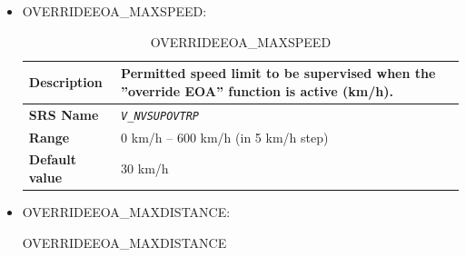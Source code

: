 \begin{itemize}
\begin{longtable}{|l|l|}
				\hline

			\end{longtable}

		\item OVERRIDEEOA\_MAXSPEED:

			\begin{longtable}{|l|l|}
				\caption{OVERRIDEEOA\_MAXSPEED}\\
				\hline

					\begin{minipage}[t]{0.22\linewidth} \textbf{Description}	\end{minipage}
				&	\begin{minipage}[t]{0.78\linewidth} Permitted speed limit to be supervised when the ”override EOA” function is active (km/h). \end{minipage} \\

				\hline

					\begin{minipage}[t]{0.22\linewidth} \textbf{SRS Name}	\end{minipage}
				&	\begin{minipage}[t]{0.78\linewidth} \emph{\texttt{V\_NVSUPOVTRP}} \end{minipage} \\

				\hline

					\begin{minipage}[t]{0.22\linewidth} \textbf{Range}	\end{minipage}
				&	\begin{minipage}[t]{0.78\linewidth} 0 km/h – 600 km/h (in 5 km/h step) \end{minipage} \\

				\hline

					\begin{minipage}[t]{0.22\linewidth} \textbf{Default value}	\end{minipage}
				&	\begin{minipage}[t]{0.78\linewidth} 30 km/h \end{minipage} \\

				\hline

			\end{longtable}

		\item OVERRIDEEOA\_MAXDISTANCE:

			\begin{longtable}{|l|l|}
				\caption{OVERRIDEEOA\_MAXDISTANCE}\\
				\hline


\end{longtable}
\end{itemize}

